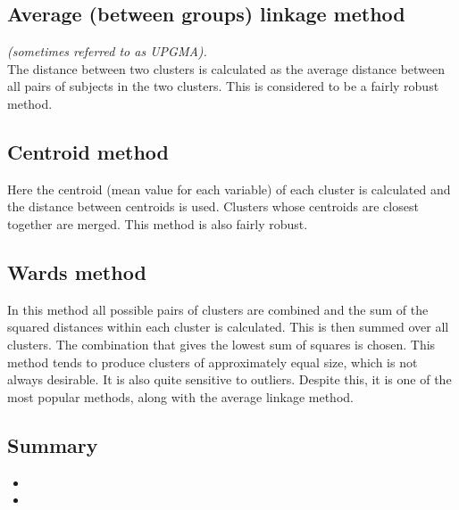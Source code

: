 \documentclass[SKLCluster.tex]{subfiles}
\begin{document}
\subsection{Average (between groups) linkage method }
\textit{(sometimes referred to as UPGMA).}\\
The distance between two clusters is calculated as the average distance between all pairs
of subjects in the two clusters. This is considered to be a fairly robust method.

\subsection{Centroid method}
Here the centroid (mean value for each variable) of each cluster is calculated and the
distance between centroids is used. Clusters whose centroids are closest together are
merged. This method is also fairly robust.

\subsection{Wards method}
In this method all possible pairs of clusters are combined and the sum of the squared
distances within each cluster is calculated. This is then summed over all clusters. The
combination that gives the lowest sum of squares is chosen. This method tends to
produce clusters of approximately equal size, which is not always desirable. It is also
quite sensitive to outliers. Despite this, it is one of the most popular methods, along
with the average linkage method.

\subsection{Summary}
\begin{itemize}
\item
\item
\end{itemize}
\end{document}
